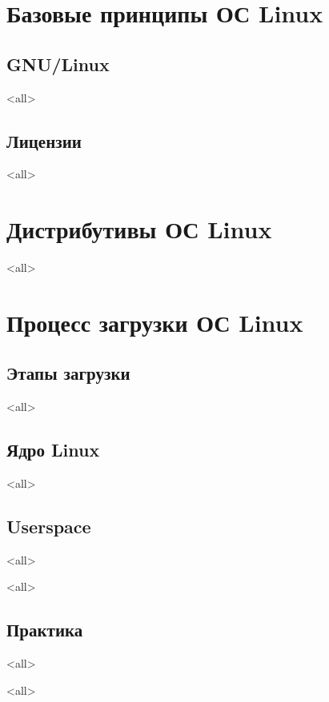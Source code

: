 \section[Принципы]{Базовые принципы ОС Linux}

\subsection{GNU/Linux}

\mode<all>{}

\subsection{Лицензии}

\mode<all>{}



\section{Дистрибутивы ОС Linux}

\mode<all>{}

\section{Процесс загрузки ОС Linux}

\subsection{Этапы загрузки}

\mode<all>{}

\subsection{Ядро Linux}

\mode<all>{}

\subsection{Userspace}

\mode<all>{}

\mode<all>{}

\subsection{Практика}

\mode<all>{}


\mode<all>

